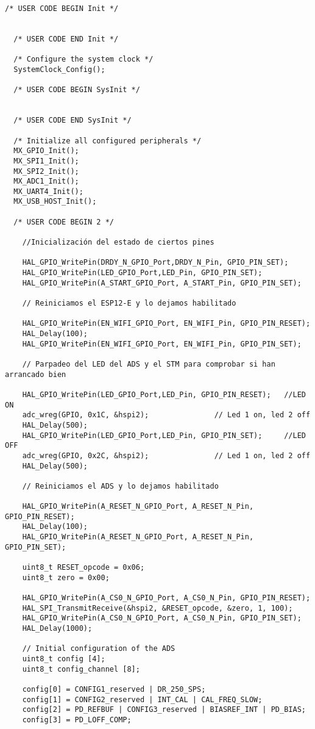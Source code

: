 \begin{lstlisting}[label=algoritmo:STM32F4:main.c,style = STM-code,frame=single,caption=STM32F4:main.c]
  /* USER CODE BEGIN Init */

	
  /* USER CODE END Init */

  /* Configure the system clock */
  SystemClock_Config();

  /* USER CODE BEGIN SysInit */
	
		
  /* USER CODE END SysInit */

  /* Initialize all configured peripherals */
  MX_GPIO_Init();
  MX_SPI1_Init();
  MX_SPI2_Init();
  MX_ADC1_Init();
  MX_UART4_Init();
  MX_USB_HOST_Init();

  /* USER CODE BEGIN 2 */
	
	//Inicialización del estado de ciertos pines
	
	HAL_GPIO_WritePin(DRDY_N_GPIO_Port,DRDY_N_Pin, GPIO_PIN_SET);
	HAL_GPIO_WritePin(LED_GPIO_Port,LED_Pin, GPIO_PIN_SET);
	HAL_GPIO_WritePin(A_START_GPIO_Port, A_START_Pin, GPIO_PIN_SET);

	// Reiniciamos el ESP12-E y lo dejamos habilitado
	
	HAL_GPIO_WritePin(EN_WIFI_GPIO_Port, EN_WIFI_Pin, GPIO_PIN_RESET);
	HAL_Delay(100);
	HAL_GPIO_WritePin(EN_WIFI_GPIO_Port, EN_WIFI_Pin, GPIO_PIN_SET);

	// Parpadeo del LED del ADS y el STM para comprobar si han arrancado bien
	
	HAL_GPIO_WritePin(LED_GPIO_Port,LED_Pin, GPIO_PIN_RESET); 	//LED ON
	adc_wreg(GPIO, 0x1C, &hspi2);				// Led 1 on, led 2 off
	HAL_Delay(500);
	HAL_GPIO_WritePin(LED_GPIO_Port,LED_Pin, GPIO_PIN_SET); 	//LED OFF
	adc_wreg(GPIO, 0x2C, &hspi2);				// Led 1 on, led 2 off
	HAL_Delay(500);
	
	// Reiniciamos el ADS y lo dejamos habilitado

	HAL_GPIO_WritePin(A_RESET_N_GPIO_Port, A_RESET_N_Pin, GPIO_PIN_RESET);
	HAL_Delay(100);
	HAL_GPIO_WritePin(A_RESET_N_GPIO_Port, A_RESET_N_Pin, GPIO_PIN_SET);
	
	uint8_t RESET_opcode = 0x06;
	uint8_t zero = 0x00;
	
	HAL_GPIO_WritePin(A_CS0_N_GPIO_Port, A_CS0_N_Pin, GPIO_PIN_RESET);
	HAL_SPI_TransmitReceive(&hspi2, &RESET_opcode, &zero, 1, 100);
	HAL_GPIO_WritePin(A_CS0_N_GPIO_Port, A_CS0_N_Pin, GPIO_PIN_SET);
	HAL_Delay(1000);
	
	// Initial configuration of the ADS
	uint8_t config [4];
	uint8_t config_channel [8];
	
	config[0] = CONFIG1_reserved | DR_250_SPS;
	config[1] = CONFIG2_reserved | INT_CAL | CAL_FREQ_SLOW;
	config[2] = PD_REFBUF | CONFIG3_reserved | BIASREF_INT | PD_BIAS;
	config[3] = PD_LOFF_COMP;
	

\end{lstlisting}
